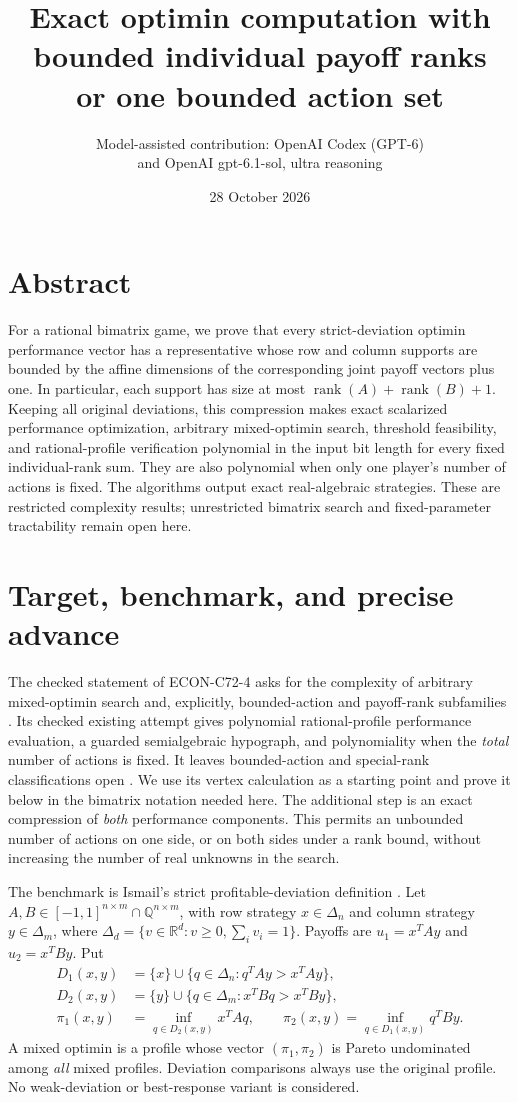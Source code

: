 \documentclass[11pt]{article}
\title{Exact optimin computation with bounded individual payoff ranks\\or one bounded action set}
\author{Model-assisted contribution: OpenAI Codex (GPT-6)\\and OpenAI gpt-6.1-sol, ultra reasoning}
\date{28 October 2026}
\theoremstyle{remark}
\newcommand{\R}{\mathbb R}
\newcommand{\Q}{\mathbb Q}
\newcommand{\rank}{\operatorname{rank}}
\begin{document}
\maketitle
\section*{Abstract}
For a rational bimatrix game, we prove that every strict-deviation optimin performance vector has a representative whose row and column supports are bounded by the affine dimensions of the corresponding joint payoff vectors plus one. In particular, each support has size at most $\rank(A)+\rank(B)+1$. Keeping all original deviations, this compression makes exact scalarized performance optimization, arbitrary mixed-optimin search, threshold feasibility, and rational-profile verification polynomial in the input bit length for every fixed individual-rank sum. They are also polynomial when only one player's number of actions is fixed. The algorithms output exact real-algebraic strategies. These are restricted complexity results; unrestricted bimatrix search and fixed-parameter tractability remain open here.


\section{Target, benchmark, and precise advance}
The checked statement of ECON-C72-4 asks for the complexity of arbitrary mixed-optimin search and, explicitly, bounded-action and payoff-rank subfamilies \cite{statement}. Its checked existing attempt gives polynomial rational-profile performance evaluation, a guarded semialgebraic hypograph, and polynomiality when the \emph{total} number of actions is fixed. It leaves bounded-action and special-rank classifications open \cite{attempt}. We use its vertex calculation as a starting point and prove it below in the bimatrix notation needed here. The additional step is an exact compression of \emph{both} performance components. This permits an unbounded number of actions on one side, or on both sides under a rank bound, without increasing the number of real unknowns in the search.

The benchmark is Ismail's strict profitable-deviation definition \cite[Definitions 1--3]{ismail}. Let $A,B\in[-1,1]^{n\times m}\cap\Q^{n\times m}$, with row strategy $x\in\Delta_n$ and column strategy $y\in\Delta_m$, where $\Delta_d=\{v\in\R^d:v\ge0,\sum_i v_i=1\}$. Payoffs are $u_1=x^TAy$ and $u_2=x^TBy$. Put
\begin{align*}
D_1(x,y)&=\{x\}\cup\{q\in\Delta_n:q^TAy>x^TAy\},\\
D_2(x,y)&=\{y\}\cup\{q\in\Delta_m:x^TBq>x^TBy\},\\
\pi_1(x,y)&=\inf_{q\in D_2(x,y)}x^TAq,\qquad
\pi_2(x,y)=\inf_{q\in D_1(x,y)}q^TBy.
\end{align*}
A mixed optimin is a profile whose vector $(\pi_1,\pi_2)$ is Pareto undominated among \emph{all} mixed profiles. Deviation comparisons always use the original profile. No weak-deviation or best-response variant is considered.
\end{document}
